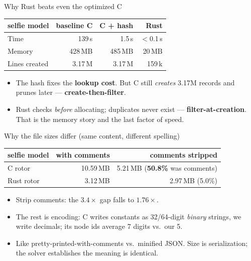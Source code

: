 \documentclass[aspectratio=169]{beamer}
\newcommand{\key}[1]{\textbf{\color{accentdk}#1}}
\begin{document}
\begin{frame}{Why Rust beats even the optimized C}
  \centering\scriptsize
  \begin{tabular}{lrrr}
    \toprule
    selfie model & baseline C & C + hash & Rust\\
    \midrule
    Time          & 139\,s  & 1.5\,s  & $<$0.1\,s\\
    Memory        & 428\,MB & 485\,MB & 20\,MB\\
    Lines created & 3.17\,M & 3.17\,M & 159\,k\\
    \bottomrule
  \end{tabular}
  \vspace{0.5em}
  \begin{itemize}\setlength\itemsep{0.25em}\footnotesize
    \item The hash fixes the \key{lookup cost}. But C still \emph{creates}
          3.17M records and prunes later --- \key{create-then-filter}.
    \item Rust checks \emph{before} allocating; duplicates never exist ---
          \key{filter-at-creation}. That is the memory story and the last
          factor of speed.
  \end{itemize}
\end{frame}

\begin{frame}{Why the file sizes differ (same content, different spelling)}
  \centering\scriptsize
  \begin{tabular}{lrr}
    \toprule
    selfie model & with comments & comments stripped\\
    \midrule
    C rotor    & 10.59\,MB & 5.21\,MB \;\;(\textbf{50.8\%} was comments)\\
    Rust rotor & 3.12\,MB  & 2.97\,MB \;\;(5.0\%)\\
    \bottomrule
  \end{tabular}
  \vspace{0.5em}
  \begin{itemize}\setlength\itemsep{0.25em}\footnotesize
    \item Strip comments: the $3.4\times$ gap falls to $1.76\times$.
    \item The rest is encoding: C writes constants as 32/64-digit \emph{binary}
          strings, we write decimals; its node ids average 7 digits vs.\ our 5.
    \item Like pretty-printed-with-comments vs.\ minified JSON. Size is
          serialization; \alert{the solver establishes the meaning is identical}.
  \end{itemize}
\end{frame}
\end{document}

